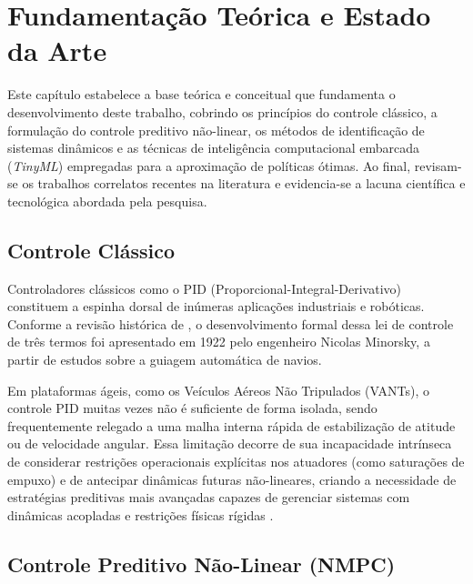\chapter{Fundamentação Teórica e Estado da Arte}
\label{cap:fundamentacao}

Este capítulo estabelece a base teórica e conceitual que fundamenta o desenvolvimento deste trabalho, cobrindo os princípios do controle clássico, a formulação do controle preditivo não-linear, os métodos de identificação de sistemas dinâmicos e as técnicas de inteligência computacional embarcada (\textit{TinyML}) empregadas para a aproximação de políticas ótimas. Ao final, revisam-se os trabalhos correlatos recentes na literatura e evidencia-se a lacuna científica e tecnológica abordada pela pesquisa.

\section{Controle Clássico}
\label{sec:fund_classico}

Controladores clássicos como o PID (Proporcional-Integral-Derivativo) constituem a espinha dorsal de inúmeras aplicações industriais e robóticas. Conforme a revisão histórica de , o desenvolvimento formal dessa lei de controle de três termos foi apresentado em 1922 pelo engenheiro Nicolas Minorsky, a partir de estudos sobre a guiagem automática de navios.

Em plataformas ágeis, como os Veículos Aéreos Não Tripulados (VANTs), o controle PID muitas vezes não é suficiente de forma isolada, sendo frequentemente relegado a uma malha interna rápida de estabilização de atitude ou de velocidade angular. Essa limitação decorre de sua incapacidade intrínseca de considerar restrições operacionais explícitas nos atuadores (como saturações de empuxo) e de antecipar dinâmicas futuras não-lineares, criando a necessidade de estratégias preditivas mais avançadas capazes de gerenciar sistemas com dinâmicas acopladas e restrições físicas rígidas \cite{nguyen2020}.

\section{Controle Preditivo Não-Linear (NMPC)}
\label{sec:fund_nmpc}

